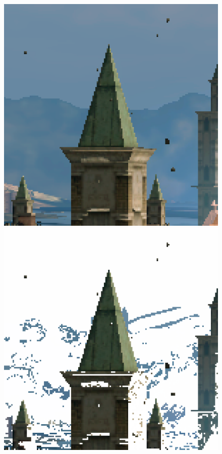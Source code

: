 \begin{enumerate}
\begin{figure}[H]
\begin{minipage}{0.47\textwidth}
  \includegraphics[width=0.95\linewidth]{src/test3.png}
\end{minipage}%
\begin{minipage}{0.47\textwidth}
  \includegraphics[width=0.95\linewidth]{src/ans3.png}
\end{minipage}
\end{figure}

\end{enumerate}

